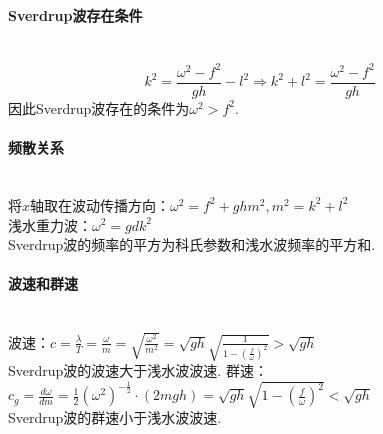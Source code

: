 \documentclass[a4paper,12pt]{article}
\begin{document}
    \paragraph{Sverdrup波存在条件}~{}
    \[
        k^{2}=\frac{\omega^{2}-f^{2}}{g h}-l^{2} \Rightarrow k^{2}+l^{2}=\frac{\omega^{2}-f^{2}}{g h}
    \]
    因此Sverdrup波存在的条件为$\omega^2>f^2$.\\
    \paragraph{频散关系}~{}\\
    将$x$轴取在波动传播方向：$\omega^2=f^2+ghm^2,m^2=k^2+l^2$\\
    浅水重力波：$\omega^2=gdk^2$\\
    Sverdrup波的频率的平方为科氏参数和浅水波频率的平方和.
    \paragraph{波速和群速}~{}\\
    波速：$\displaystyle c=\frac{\lambda}{T}=\frac{\omega}{m}=\sqrt{\frac{\omega^{2}}{m^{2}}}=\sqrt{g h} \sqrt{\frac{1}{1-\left(\frac{f}{\omega}\right)^{2}}}>\sqrt{g h}$\\
    Sverdrup波的波速大于浅水波波速.
    群速：$\displaystyle c_{g}=\frac{d \omega}{d m}=\frac{1}{2}\left(\omega^{2}\right)^{-\frac{1}{2}} \cdot(2 m g h)=\sqrt{g h} \sqrt{1-\left(\frac{f}{\omega}\right)^{2}}<\sqrt{g h}$\\
    Sverdrup波的群速小于浅水波波速.
\end{document}
